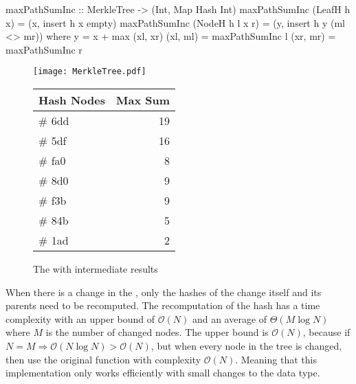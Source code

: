 \begin{haskell}
maxPathSumInc :: MerkleTree -> (Int, Map Hash Int)    
maxPathSumInc (LeafH h x)     = (x, insert h x empty)
maxPathSumInc (NodeH h l x r) = (y, insert h y (ml <> mr))  
  where
    y = x + max (xl, xr)
    (xl, ml) = maxPathSumInc l
    (xr, mr) = maxPathSumInc r
\end{haskell}
\vspace{15pt}
\begin{figure}[H]
    \begin{minipage}[c]{0.55\textwidth}
        \centering
        \texttt{[image: MerkleTree.pdf]}
    \end{minipage}
    \hspace{0.1\textwidth}
    \begin{minipage}[c]{0.35\textwidth}
        \centering
        \begin{tabular}{|l|r|}
            \hline
            \textbf{Hash Nodes} & \textbf{Max Sum} \\
            \hline
            \# 6dd & 19 \\
            \hline
            \# 5df & 16 \\
            \hline
            \# fa0 & 8 \\
            \hline
            \# 8d0 & 9 \\
            \hline
            \# f3b & 9 \\
            \hline
            \# 84b & 5 \\
            \hline
            \# 1ad & 2 \\
            \hline
        \end{tabular}
    \end{minipage}
    \caption{The  with intermediate results}    
\end{figure}

When there is a change in the , only the hashes of the change itself and its parents need to be recomputed. The recomputation of the hash has a time complexity with an upper bound of $\mathcal{O}(N)$ and an average of $\Theta(M \log{N})$ where $M$ is the number of changed nodes. The upper bound is $\mathcal{O}(N)$, because if $N = M \Rightarrow \mathcal{O}(N \log{N}) > \mathcal{O}(N)$, but when every node in the tree is changed, then use the original function with complexity $\mathcal{O}(N)$. Meaning that this implementation only works efficiently with small changes to the data type.

